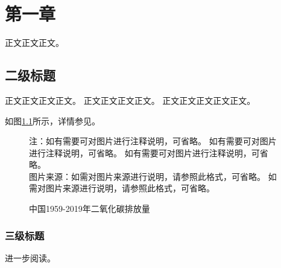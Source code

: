 
\chapter{第一章}
\zhlipsum* 正文正文正文\cite{zhang_study_2013}。

\section{二级标题}
正文正文正文正文\cite{chen_problem-solving_2019,dasgupta_handbook_2018}。
\zhlipsum*
正文正文正文正文\cite{barberis_survey_2003,heckman_chapter_2007,__2014}。
正文正文正文正文正文\cite{__2015}。

如图\ref{fig:co2}所示，\zhlipsum*[1]
详情参见\cite{yin_quantifying_2019}。

\begin{figure}[H]
  \caption{中国1959-2019年二氧化碳排放量\label{fig:co2}}
  \vspace{1.5ex}
  \begin{minipage}{\textwidth}
    \small
    \phantom{缩进}注：如有需要可对图片进行注释说明，可省略。
    如有需要可对图片进行注释说明，可省略。
    如有需要可对图片进行注释说明，可省略。\\
    \phantom{缩进}图片来源：如需对图片来源进行说明，请参照此格式，可省略。
    如需对图片来源进行说明，请参照此格式，可省略。
  \end{minipage}
\end{figure}
\vspace{-3ex}
\zhlipsum

\subsection{三级标题}
\zhlipsum* 进一步阅读\cite{__2017,schmitt-grohe_covid-19_2020,__2020,__2019}。








